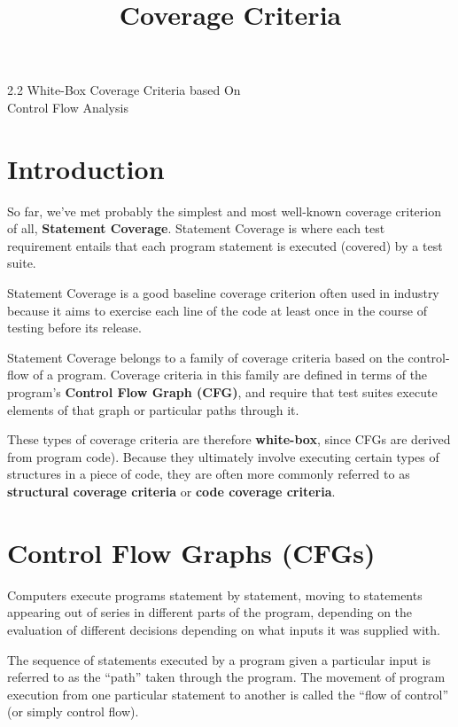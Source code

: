 



\title{Coverage Criteria}{2.2 White-Box Coverage Criteria based On\\ Control Flow Analysis}


\section{Introduction}
%
So far, we've met probably the simplest and most well-known coverage criterion
of all, {\bf Statement Coverage}. Statement Coverage is where each test
requirement entails that each program statement is executed (covered) by a test
suite. 

Statement Coverage is a good baseline coverage criterion often used in industry
because it aims to exercise each line of the code at least once in the course of
testing before its release.

Statement Coverage belongs to a family of coverage criteria based on the
control-flow of a program. Coverage criteria in this family are defined in terms
of the program's {\bf Control Flow Graph (CFG)}, and require that test suites
execute elements of that graph or particular paths through it. 

These types of coverage criteria are therefore {\bf white-box}, since CFGs are
derived from program code). Because they ultimately involve executing certain
types of structures in a piece of code, they are often more commonly referred to
as {\bf structural coverage criteria} or {\bf code coverage criteria}.


\section{Control Flow Graphs (CFGs)}


Computers execute programs statement by statement, moving to statements
appearing out of series in different parts of the program, depending on the
evaluation of different decisions depending on what inputs it was supplied with.

The sequence of statements executed by a program given a particular input is
referred to as the ``path'' taken through the program. The movement of program
execution from one particular statement to another is called the ``flow of
control'' (or simply control flow).

